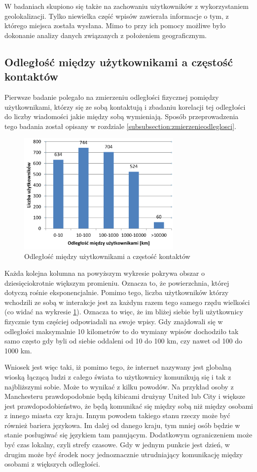 W badaniach skupiono się także na zachowaniu użytkowników z wykorzystaniem 
geolokalizacji. Tylko niewielka część wpisów
zawierała informacje o tym, z którego miejsca została wysłana.
Mimo to przy ich pomocy możliwe było dokonanie analizy danych związanych z
położeniem geograficznym.

\subsection{Odległość między użytkownikami a częstość kontaktów}
\label{subsection:odlegloscmiedzyuzytkownikami}
Pierwsze badanie polegało na zmierzeniu odległości fizycznej pomiędzy
użytkownikami, którzy się ze sobą kontaktują i zbadaniu korelacji tej odległości
do liczby wiadomości jakie między sobą wymieniają. Sposób przeprowadzenia tego
badania został opisany w rozdziale \ref{subsubsection:zmierzenieodleglosci}.

\begin{figure}[ht!]
\centering
\includegraphics[width=80mm]{img/relacje-a-odleglosc.png}
\caption{Odległość między użytkownikami a częstość kontaktów}
\label{image:relacje-a-odleglosc}
\end{figure}

Każda kolejna kolumna na powyższym wykresie pokrywa obszar o dziesięciokrotnie 
większym promieniu. Oznacza to, że powierzchnia, której dotyczą rośnie
eksponencjalnie. Pomimo tego, liczba użytkowników którzy wchodzili ze sobą
w interakcje jest za każdym razem tego samego rzędu wielkości (co widać na
wykresie \ref{image:relacje-a-odleglosc}).
Oznacza to więc, że im bliżej siebie byli użytkownicy fizycznie tym częściej
odpowiadali na swoje wpisy. Gdy znajdowali się w odległości maksymalnie
10 kilometrów to do wymiany wpisów dochodziło tak samo
często gdy byli od siebie oddaleni od 10 do 100 km, czy nawet od 100 do 1000 km.

Wniosek jest więc taki, iż pomimo tego, że internet nazywany jest globalną wioską
łączącą ludzi z całego świata to użytkownicy komunikują się i tak z najbliższymi
sobie. Może to wynikać z kilku powodów. Na przykład osoby z Manchesteru 
prawdopodobnie będą kibicami drużyny United lub City i większe jest prawdopodobieństwo,
że będą komunikać się między sobą niż między osobami z innego miasta czy kraju.
Innym powodem takiego stanu rzeczy może być również bariera językowa.
Im dalej od danego kraju, tym mniej osób będzie w stanie posługiwać się językiem
tam panującym. Dodatkowym ograniczeniem może być czas lokalny, czyli strefy czasowe.
Gdy w jednym punkcie jest dzień, w drugim może być środek nocy jednoznacznie 
utrudniający komunikację między osobami z większych odległości.  

